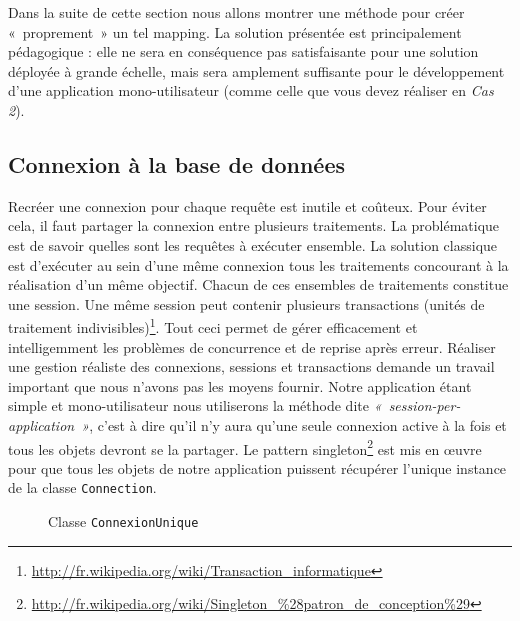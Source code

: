 \documentclass[a4paper,11pt]{article}
\begin{document}
Dans la suite de cette section nous allons montrer une méthode pour créer «~proprement~»  un tel mapping. La solution 
présentée est principalement pédagogique : elle ne sera en conséquence pas satisfaisante pour une solution déployée 
à grande échelle, mais sera amplement suffisante  pour le développement d'une application mono-utilisateur (comme celle 
que vous devez réaliser en \emph{Cas 2}).

\subsection{Connexion à la base de données}
Recréer une connexion pour chaque requête est inutile et coûteux. Pour éviter cela, il faut  partager la connexion entre
plusieurs traitements. La problématique est de savoir quelles sont les  requêtes à exécuter ensemble. La solution 
classique est d'exécuter au sein d'une même connexion  tous les traitements concourant à la réalisation d'un même 
objectif. Chacun de ces ensembles  de traitements constitue une session. Une même session peut contenir plusieurs 
transactions  (unités de traitement indivisibles)\footnote{\url{http://fr.wikipedia.org/wiki/Transaction_informatique}}.
Tout ceci permet de gérer efficacement et intelligemment  les problèmes de concurrence et de reprise après erreur. 
Réaliser une gestion réaliste des  connexions, sessions et transactions demande un travail important que nous n'avons
pas les  moyens fournir. Notre application étant simple et mono-utilisateur nous utiliserons la méthode  dite 
\emph{«~session-per-application~»}, c'est à dire qu'il n'y aura qu'une seule connexion active  à la fois et tous les 
objets devront se la partager. Le pattern  singleton\footnote{\url{http://fr.wikipedia.org/wiki/Singleton_\%28patron_de_conception\%29}} 
est mis en œuvre pour  que tous les objets de notre application puissent récupérer l'unique instance de la classe 
\texttt{Connection}.

\begin{figure}\centering
{}
\caption{Classe \texttt{ConnexionUnique}\label{connexion}}
\end{figure}
\end{document}
